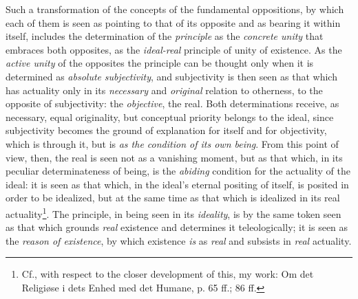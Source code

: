 Such a transformation of the concepts of the fundamental oppositions,
by which each of them is seen as pointing to that of its opposite and
as bearing it within itself, includes the determination of the
\emph{principle} as the \emph{concrete unity} that embraces both
opposites, as the \emph{ideal-real} principle of unity of existence. As
the \emph{active unity} of the opposites the principle can be thought
only when it is determined as \emph{absolute} \emph{subjectivity}, and
subjectivity is then seen as that which has actuality only in its
\emph{necessary} and \emph{original} relation to otherness, to the
opposite of subjectivity: the \emph{objective}, the real. Both
determinations receive, as necessary, equal originality, but conceptual
priority belongs to the ideal, since subjectivity becomes the ground of
explanation for itself and for objectivity, which is through it, but is
\emph{as the condition of its own being}. From this point of view,
then, the real is seen not as a vanishing moment, but as that which, in
its peculiar determinateness of being, is the \emph{abiding} condition
for the actuality of the ideal: it is seen as that which, in the
ideal's eternal positing of itself, is posited in order to be
idealized, but at the same time as that which is idealized in its real
actuality\footnote{
Cf., with respect to the closer development of this, my work:
Om det Religiøse i dets Enhed med det Humane, p. 65 ff.; 86 ff.}.
The principle, in being seen in its \emph{ideality}, is by the same
token seen as that which grounds \emph{real} existence and determines
it teleologically; it is seen as the \emph{reason of existence}, by
which existence \emph{is} as \emph{real} and subsists in \emph{real}
actuality.

